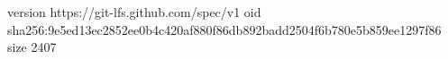 version https://git-lfs.github.com/spec/v1
oid sha256:9e5ed13ec2852ee0b4c420af880f86db892badd2504f6b780e5b859ee1297f86
size 2407
